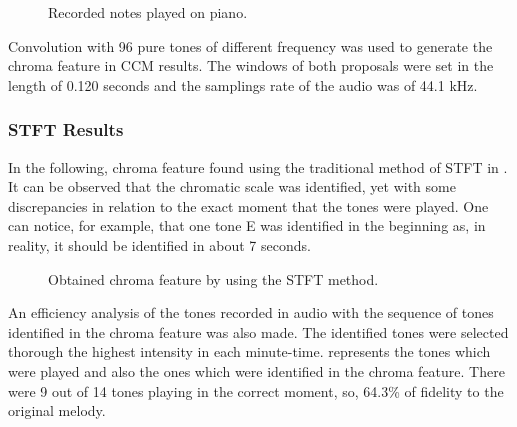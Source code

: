 \documentclass{article}
\begin{document}
	\begin{figure}[h!]
	 \centerline{}
	 \caption{Recorded notes played on piano.}
	 \label{fig:1-notes}
	\end{figure}

	Convolution with 96 pure tones of different frequency was used to generate the chroma feature in CCM results. The windows of both proposals were set in the length of 0.120 seconds and the samplings rate of the audio was of 44.1 kHz.

	\subsubsection{STFT Results}
	In the following, chroma feature found using the traditional method of STFT in . It can be observed that the chromatic scale was identified, yet with some discrepancies in relation to the exact moment that the tones were played. One can notice, for example, that one tone E was identified in the beginning as, in reality, it should be identified in about 7 seconds. 

	
	\begin{figure}[h!]
	 \centerline{}
	 \caption{Obtained chroma feature by using the STFT method.}
	 \label{fig:1-ssft}
	\end{figure}	

	
	An efficiency analysis of the tones recorded in audio with the sequence of tones identified in the chroma feature was also made. The identified tones were selected thorough the highest intensity in each minute-time.  represents the tones which were played and also the ones which were identified in the chroma feature. There were 9 out of 14 tones playing in the correct moment, so, 64.3\% of fidelity to the original melody.  
\end{document}

